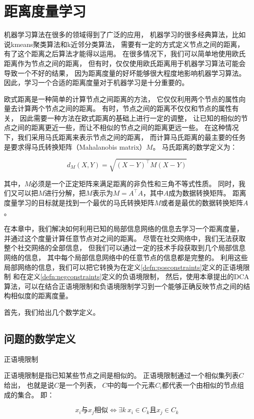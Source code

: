 \chapter{距离度量学习}
\label{chap:dca}


机器学习算法在很多的领域得到了广泛的应用，
机器学习的很多经典算法，比如说kmeans聚类算法和k近邻分类算法，
需要有一定的方式定义节点之间的距离，有了这个距离之后算法才能得以运用。
在很多情况下，我们可以简单地使用欧氏距离作为节点之间的距离，
但有时，仅仅使用欧氏距离用于机器学习算法可能会导致一个不好的结果，
因为距离度量的好坏能够很大程度地影响机器学习算法。
因此，学习一个合适的距离度量对于机器学习是十分重要的。

欧式距离是一种简单的计算节点之间距离的方法，
它仅仅利用两个节点的属性向量去计算两个节点之间的距离。
有时，节点之间的距离不仅仅和节点的属性有关，
因此需要一种方法在欧式距离的基础上进行一定的调整，
让已知的相似的节点之间的距离更近一些，而让不相似的节点之间的距离更远一些。
在这种情况下，我们采用马氏距离来表示节点之间的距离，
而计算马氏距离的最主要的任务是要求得马氏转换矩阵（Mahalanobis matrix）$M$。
马氏距离的数学定义为：

\begin{equation}
    d_M(X, Y) = \sqrt{(X - Y)^\top M (X - Y)}
\end{equation}

其中，$M$必须是一个正定矩阵来满足距离的非负性和三角不等式性质。
同时，我们又可以把$M$进行分解，把$M$表示为$M = A^\top A$，其中$A$成为数据转换矩阵。
距离度量学习的目标就是找到一个最优的马氏转换矩阵$M$或者是最优的数据转换矩阵$A$。

在本章中，我们解决如何利用已知的局部信息网络的信息去学习一个距离度量，
并通过这个度量计算任意节点对之间的距离。
尽管在社交网络中，我们无法获取整个社交网络的全部信息，
但我们可以通过一定的技术手段获取到几个局部信息网络的信息，
其中每个局部信息网络中的任意节点的信息都是完整的。
利用这些局部网络的信息，我们可以把它转换为在定义\ref{defn:posconstraints}定义的正语境限制
和在定义\ref{defn:negconstraints}定义的负语境限制，
然后，使用本章提出的DCA算法，可以在结合正语境限制和负语境限制学习到一个能够正确反映节点之间的结构相似度的距离度量。

首先，我们给出几个数学定义。

\section{问题的数学定义}
\label{sec:dcadef}

\begin{defn}{正语境限制}
\label{defn:posconstraints}

    正语境限制是指已知某些节点之间是相似的。
    正语境限制通过一个相似集列表$C$给出，
    也就是说$C$是一个列表，
    $C$中的每一个元素$C_i$都代表一个由相似的节点组成的集合。
    即：

    $$
    x_i\text{与}x_j\text{相似} \Longleftrightarrow \exists k \ x_i \in C_k \text{且} x_j \in C_k 
    $$

\end{defn}

